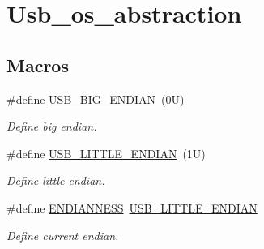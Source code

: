 \hypertarget{group__usb__os__abstraction}{\section{Usb\-\_\-os\-\_\-abstraction}
\label{group__usb__os__abstraction}
}
\subsection*{Macros}
\begin{DoxyCompactItemize}
\item 
\#define \hyperlink{group__usb__os__abstraction_gad5944548f0bdc76acfc43c033bd5a03c}{U\-S\-B\-\_\-\-B\-I\-G\-\_\-\-E\-N\-D\-I\-A\-N}~(0\-U)
\begin{DoxyCompactList}\small\item\em Define big endian. \end{DoxyCompactList}\item 
\#define \hyperlink{group__usb__os__abstraction_gaf92fbbf185d7cfa676bde9c48a9fd6b5}{U\-S\-B\-\_\-\-L\-I\-T\-T\-L\-E\-\_\-\-E\-N\-D\-I\-A\-N}~(1\-U)
\begin{DoxyCompactList}\small\item\em Define little endian. \end{DoxyCompactList}\item 
\#define \hyperlink{group__usb__os__abstraction_ga10ef90ec5d824df4e5d923db4939e45c}{E\-N\-D\-I\-A\-N\-N\-E\-S\-S}~\hyperlink{group__usb__os__abstraction_gaf92fbbf185d7cfa676bde9c48a9fd6b5}{U\-S\-B\-\_\-\-L\-I\-T\-T\-L\-E\-\_\-\-E\-N\-D\-I\-A\-N}
\begin{DoxyCompactList}\small\item\em Define current endian. \end{DoxyCompactList}\end{DoxyCompactItemize}
